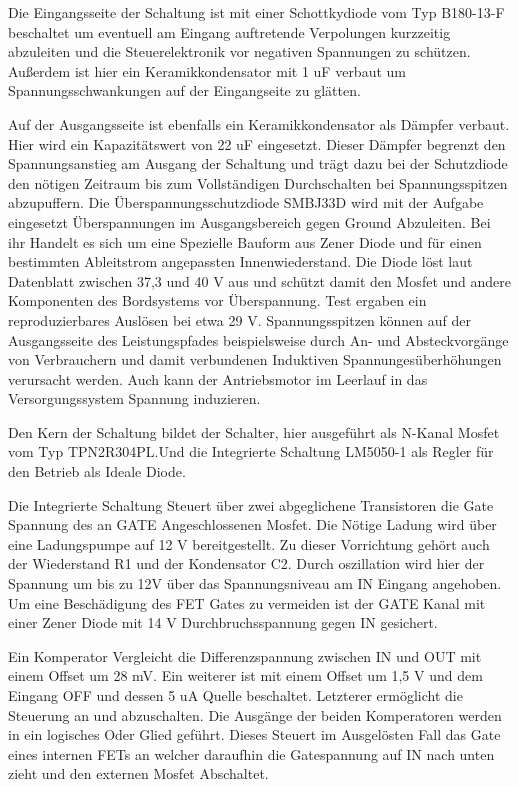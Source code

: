 Die Eingangsseite der Schaltung ist mit einer Schottkydiode vom Typ B180-13-F beschaltet um eventuell am Eingang auftretende Verpolungen kurzzeitig abzuleiten und die Steuerelektronik vor negativen Spannungen zu schützen. Außerdem ist hier ein Keramikkondensator mit 1 uF verbaut um Spannungsschwankungen auf der Eingangseite zu glätten.

Auf der Ausgangsseite ist ebenfalls ein Keramikkondensator als Dämpfer verbaut. Hier wird ein Kapazitätswert von 22 uF eingesetzt. Dieser Dämpfer begrenzt den Spannungsanstieg am Ausgang der Schaltung und trägt dazu bei der Schutzdiode den nötigen Zeitraum bis zum Vollständigen Durchschalten bei Spannungsspitzen abzupuffern.
Die Überspannungsschutzdiode SMBJ33D wird mit der Aufgabe eingesetzt Überspannungen im Ausgangsbereich gegen Ground Abzuleiten. Bei ihr Handelt es sich um eine Spezielle Bauform aus Zener Diode und für einen bestimmten Ableitstrom angepassten Innenwiederstand. Die Diode löst laut Datenblatt zwischen 37,3 und 40 V aus und schützt damit den Mosfet und andere Komponenten des Bordsystems vor Überspannung. Test ergaben ein reproduzierbares Auslösen bei  etwa 29 V. Spannungsspitzen können auf der Ausgangsseite des Leistungspfades beispielsweise durch An- und Absteckvorgänge von Verbrauchern und damit verbundenen Induktiven Spannungesüberhöhungen verursacht werden. Auch kann der Antriebsmotor im Leerlauf in das Versorgungssystem Spannung induzieren.

Den Kern der Schaltung bildet der Schalter, hier ausgeführt als N-Kanal Mosfet vom Typ TPN2R304PL.Und die Integrierte Schaltung LM5050-1 als Regler für den Betrieb als Ideale Diode.

Die Integrierte Schaltung Steuert über zwei abgeglichene Transistoren die Gate Spannung des an GATE Angeschlossenen Mosfet. Die Nötige Ladung wird über eine Ladungspumpe auf 12 V bereitgestellt. Zu dieser Vorrichtung gehört auch der Wiederstand R1 und der Kondensator C2.
Durch oszillation wird hier der Spannung um bis zu 12V  über das Spannungsniveau am IN Eingang angehoben. Um eine Beschädigung des FET Gates zu vermeiden ist der GATE Kanal mit einer Zener Diode mit 14 V Durchbruchsspannung gegen IN gesichert.

Ein Komperator Vergleicht die Differenzspannung zwischen IN und OUT mit einem Offset um 28 mV. Ein weiterer ist mit einem Offset um 1,5 V und dem Eingang OFF und dessen 5 uA Quelle beschaltet. Letzterer ermöglicht die Steuerung an und abzuschalten. Die Ausgänge der beiden Komperatoren werden in ein logisches Oder Glied geführt. Dieses Steuert im Ausgelösten Fall das Gate eines internen FETs an welcher daraufhin die Gatespannung auf IN nach unten zieht und den externen Mosfet Abschaltet. 

